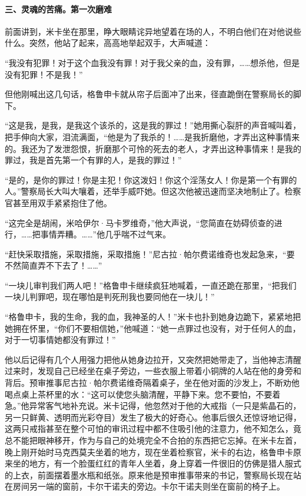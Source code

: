 \paragraph*{三、灵魂的苦痛。第一次磨难}
\par 前面讲到，米卡坐在那里，睁大眼睛诧异地望着在场的人，不明白他们在对他说些什么。突然，他站了起来，高高地举起双手，大声喊道：
\par “我没有犯罪！对于这个血我没有罪！对于我父亲的血，没有罪，……想杀他，但是没有犯罪！不是我！”
\par 但他刚喊出这几句话，格鲁申卡就从帘子后面冲了出来，径直跪倒在警察局长的脚下。
\par “这是我，是我，是我这个该杀的，这是我的罪过！”她用撕心裂肝的声音喊叫着，把手伸向大家，泪流满面，“他是为了我杀的！……是我折磨他，才弄出这种事情来的。我还为了发泄怨恨，折磨那个可怜的死去的老人，才弄出这种事情来！是我的罪过，我是首先第一个有罪的人，是我的罪过！”
\par “是的，是你的罪过！你是主犯！你这泼妇！你这个淫荡女人！你是第一个有罪的人。”警察局长大叫大嚷着，还举手威吓她。但这次他被迅速而坚决地制止了。检察官甚至用双手紧紧抱住了他。
\par “这完全是胡闹，米哈伊尔·马卡罗维奇，”他大声说，“您简直在妨碍侦查的进行，……把事情弄糟。……”他几乎喘不过气来。
\par “赶快采取措施，采取措施，采取措施！”尼古拉·帕尔费诺维奇也发起急来，“要不然简直弄不下去了！……”
\par “一块儿审判我们两人吧！”格鲁申卡继续疯狂地喊着，一直还跪在那里，“把我们一块儿判罪吧，现在哪怕是判死刑我也要同他在一块儿！”
\par “格鲁申卡，我的生命，我的血，我神圣的人！”米卡也扑到她身边跪下，紧紧地把她拥在怀里，“你们不要相信她，”他喊道：“她一点罪过也没有，对于任何人的血，对于一切事情她都没有罪过！”
\par 他以后记得有几个人用强力把他从她身边拉开，又突然把她带走了，当他神志清醒过来时，发现自己已经坐在桌子旁边，一些衣服上带着小铜牌的人站在他的身旁和背后。预审推事尼古拉·帕尔费诺维奇隔着桌子，坐在他对面的沙发上，不断劝他喝点桌上茶杯里的水：“这可以使您头脑清醒，平静下来。您不要怕，不要着急。”他异常客气地补充说。米卡记得，他忽然对于他的大戒指（一只是紫晶石的，另一只鲜黄、透明而光彩夺目）发生了极大的好奇心。他事后很久还惊讶地记得，这两只戒指甚至在整个可怕的审讯过程中都不住吸引他的注意力，他不知怎么，竟总不能把眼神移开，作为与自己的处境完全不合拍的东西把它忘掉。在米卡左首，晚上刚开始时马克西莫夫坐着的地方，现在坐着检察官，米卡的右边，格鲁申卡原来坐的地方，有一个脸蛋红红的青年人坐着，身上穿着一件很旧的仿佛是猎人服式的上衣，前面摆着墨水瓶和纸张。原来他是预审推事带来的书记，警察局长现在站在房间另一端的窗前，卡尔干诺夫的旁边。卡尔干诺夫则坐在窗前的椅子上。
